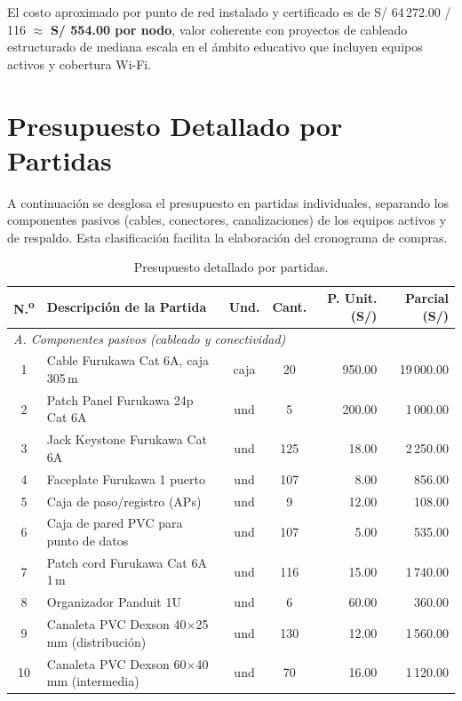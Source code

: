 \noindent El costo aproximado por punto de red instalado y certificado es de S/ 64\,272.00 / 116 $\approx$ \textbf{S/ 554.00 por nodo}, valor coherente con proyectos de cableado estructurado de mediana escala en el ámbito educativo que incluyen equipos activos y cobertura Wi-Fi.

\section{Presupuesto Detallado por Partidas}
A continuación se desglosa el presupuesto en partidas individuales, separando los componentes pasivos (cables, conectores, canalizaciones) de los equipos activos y de respaldo. Esta clasificación facilita la elaboración del cronograma de compras.

\begin{table}[H]
\centering
\caption{Presupuesto detallado por partidas.}
\label{tab:presupuesto_detallado}
\footnotesize
\begin{tabular}{clccrr}
\hline
\textbf{N.\textsuperscript{o}} & \textbf{Descripción de la Partida} & \textbf{Und.} & \textbf{Cant.} & \textbf{P. Unit. (S/)} & \textbf{Parcial (S/)} \\
\hline
\multicolumn{6}{l}{\textit{A. Componentes pasivos (cableado y conectividad)}} \\
%
1  & Cable Furukawa Cat 6A, caja 305\,m    & caja & 20  & 950.00    & 19\,000.00 \\
2  & Patch Panel Furukawa 24p Cat 6A       & und  & 5   & 200.00    & 1\,000.00 \\
3  & Jack Keystone Furukawa Cat 6A         & und  & 125 & 18.00     & 2\,250.00 \\
4  & Faceplate Furukawa 1 puerto           & und  & 107 & 8.00      & 856.00 \\
5  & Caja de paso/registro (APs)           & und  & 9   & 12.00     & 108.00 \\
6  & Caja de pared PVC para punto de datos & und  & 107 & 5.00      & 535.00 \\
7  & Patch cord Furukawa Cat 6A 1\,m       & und  & 116 & 15.00     & 1\,740.00 \\
8  & Organizador Panduit 1U                & und  & 6   & 60.00     & 360.00 \\
9  & Canaleta PVC Dexson 40$\times$25\,mm (distribución) & und & 130 & 12.00 & 1\,560.00 \\
10 & Canaleta PVC Dexson 60$\times$40\,mm (intermedia)   & und & 70  & 16.00 & 1\,120.00 \\

\end{tabular}
\end{table}
